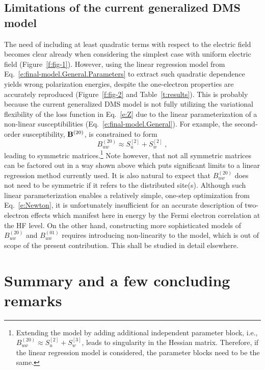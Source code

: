 \documentclass[aip,amsmath,amssymb,reprint,floatfix]{revtex4-1}
\begin{document}
\subsection{\label{ss:43}Limitations of the current generalized DMS model}

The need of including at least quadratic terms with respect to the electric field becomes clear
already when considering the simplest case with uniform electric field (Figure~\ref{f:fig-1}).
However, using the linear regression model from Eq.~\eqref{e:final-model.General.Parameters} 
to extract such quadratic dependence
yields wrong polarization energies, despite the one\hyp{}electron properties are accurately reproduced
(Figure~\ref{f:fig-2} and Table~\ref{t:results}).
This is probably because the current generalized DMS model is not fully utilizing the variational flexibility
of the loss function in Eq.~\eqref{e:Z} due to the linear parameterization of a non\hyp{}linear susceptibilities 
(Eq.~\eqref{e:final-model.General}). 
For example, the second\hyp{}order susceptibility, ${\bf B}^{(20)}$, is constrained to
form
%
\begin{equation}
 B_{uw}^{(20)} \approx S_u^{[2]} + S_w^{[2]} \;,
\end{equation}
%
leading to symmetric matrices.\footnote{Extending the model by adding additional independent parameter block, i.e.,
$B_{uw}^{(20)} \approx S_u^{[2]} + S_w^{[3]}$, leads to singularity in the Hessian matrix. Therefore,
if the linear regression model is considered, the parameter blocks need to be the same.} 
Note however, that not all symmetric matrices
can be factored out in a way shown above which puts significant limits to a linear regression method
currently used.
It is also natural to expect that $B_{uw}^{(20)}$ does not need to be symmetric if it refers to the distributed site(s).
Although such linear parameterization enables a relatively simple, one\hyp{}step optimization
from Eq.~\eqref{e:Newton}, 
it is unfortunately insufficient for an accurate description of two\hyp{}electron effects which manifest
here in energy by the Fermi electron correlation at the HF level.
On the other hand, constructing more sophisticated models of $B_{uw}^{(20)}$ and $B_{uw}^{(01)}$ 
requires introducing non\hyp{}linearity to the model, which is out of scope of the present contribution.
This shall be studied in detail elsewhere.

\section{\label{s:5}Summary and a few concluding remarks}
\end{document}
